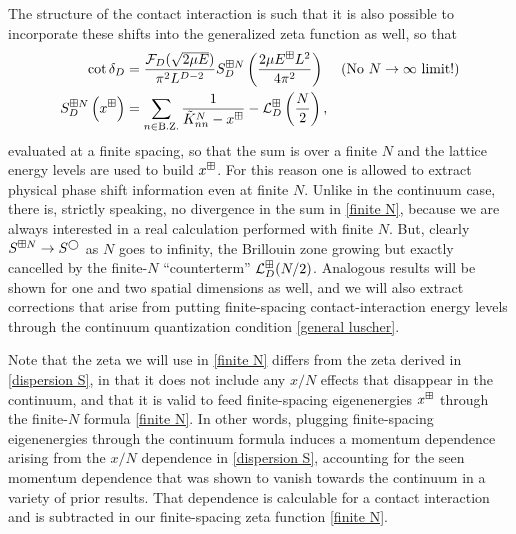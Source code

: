 The structure of the contact interaction is such that it is also possible to incorporate these shifts into the generalized zeta function as well, so that
\begin{align}
    \cot \delta_D
    &=
    \frac{\mathcal{F}_D(\sqrt{2\mu E})}{\pi^2 L^{D-2}} S^{\boxplus N}_D\left(\frac{2\mu E^{\boxplus} L^2}{4\pi^2}\right)
    && \text{(No $N\rightarrow\infty$ limit!)}
    \\
    \label{eq:finite N}
    S^{\boxplus N}_D\left(x^\boxplus\right)
    &=
		\sum_{n\in\text{B.Z.}}\frac{1}{ \tilde K_{nn}^{N} - x^\boxplus} - \mathcal{L}_D^{\boxplus}\left(\frac{N}{2}\right),
\end{align}
evaluated at a finite spacing, so that the sum is over a finite $N$ and the lattice energy levels are used to build $x^\boxplus$.
For this reason one is allowed to extract physical phase shift information even at finite $N$.
Unlike in the continuum case, there is, strictly speaking, no divergence in the sum in \eqref{finite N}, because we are always interested in a real calculation performed with finite $N$.
But, clearly $S^{\boxplus N}\rightarrow S^\bigcirc$ as $N$ goes to infinity, the Brillouin zone growing but exactly cancelled by the finite-$N$ ``counterterm'' $\mathcal{L}_D^\boxplus (N/2)$.
Analogous results will be shown for one and two spatial dimensions as well, and we will also extract corrections that arise from putting finite-spacing contact-interaction energy levels through the continuum quantization condition \eqref{general luscher}.

Note that the zeta we will use in \eqref{finite N} differs from the zeta derived in \eqref{dispersion S}, in that it does not include any $x/N$ effects that disappear in the continuum, and that it is valid to feed finite-spacing eigenenergies $x^\boxplus$ through the finite-$N$ formula \eqref{finite N}.  In other words, plugging finite-spacing eigenenergies through the continuum formula induces a momentum dependence arising from the $x/N$ dependence in \eqref{dispersion S}, accounting for the seen momentum dependence that was shown to vanish towards the continuum in a variety of prior results.  That dependence is calculable for a contact interaction and is subtracted in our finite-spacing zeta function \eqref{finite N}.
